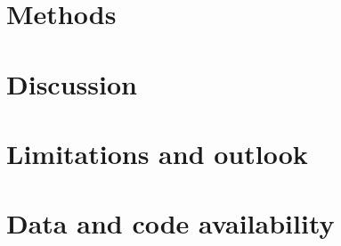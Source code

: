 \documentclass[pdflatex,sn-nature]{sn-jnl}
\begin{document}
\section*{Methods}


\section*{Discussion}


\section*{Limitations and outlook}


\section*{Data and code availability}



\end{document}
